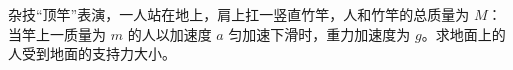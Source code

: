 杂技“顶竿”表演，一人站在地上，肩上扛一竖直竹竿，人和竹竿的总质量为 \(M\)：当竿上一质量为 \(m\) 的人以加速度 \(a\) 匀加速下滑时，重力加速度为 \(g\)。求地面上的人受到地面的支持力大小。
\begin{answer}
    
\end{answer}